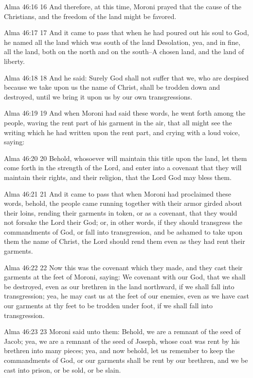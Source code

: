 Alma 46:16
 16 And therefore, at this time, Moroni prayed that the cause of
the Christians, and the freedom of the land might be favored.

Alma 46:17
 17 And it came to pass that when he had poured out his soul to
God, he named all the land which was south of the land
Desolation, yea, and in fine, all the land, both on the north and
on the south--A chosen land, and the land of liberty.

Alma 46:18
 18 And he said: Surely God shall not suffer that we, who are
despised because we take upon us the name of Christ, shall be
trodden down and destroyed, until we bring it upon us by our own
transgressions.

Alma 46:19
 19 And when Moroni had said these words, he went forth among the
people, waving the rent part of his garment in the air, that all
might see the writing which he had written upon the rent part,
and crying with a loud voice, saying:

Alma 46:20
 20 Behold, whosoever will maintain this title upon the land, let
them come forth in the strength of the Lord, and enter into a
covenant that they will maintain their rights, and their
religion, that the Lord God may bless them.

Alma 46:21
 21 And it came to pass that when Moroni had proclaimed these
words, behold, the people came running together with their armor
girded about their loins, rending their garments in token, or as
a covenant, that they would not forsake the Lord their God; or,
in other words, if they should transgress the commandments of
God, or fall into transgression, and be ashamed to take upon them
the name of Christ, the Lord should rend them even as they had
rent their garments.

Alma 46:22
 22 Now this was the covenant which they made, and they cast
their garments at the feet of Moroni, saying: We covenant with
our God, that we shall be destroyed, even as our brethren in the
land northward, if we shall fall into transgression; yea, he may
cast us at the feet of our enemies, even as we have cast our
garments at thy feet to be trodden under foot, if we shall fall
into transgression.

Alma 46:23
 23 Moroni said unto them: Behold, we are a remnant of the seed
of Jacob; yea, we are a remnant of the seed of Joseph, whose coat
was rent by his brethren into many pieces; yea, and now behold,
let us remember to keep the commandments of God, or our garments
shall be rent by our brethren, and we be cast into prison, or be
sold, or be slain.

